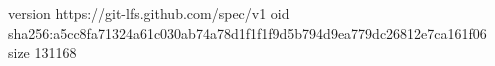 version https://git-lfs.github.com/spec/v1
oid sha256:a5cc8fa71324a61c030ab74a78d1f1f1f9d5b794d9ea779dc26812e7ca161f06
size 131168
